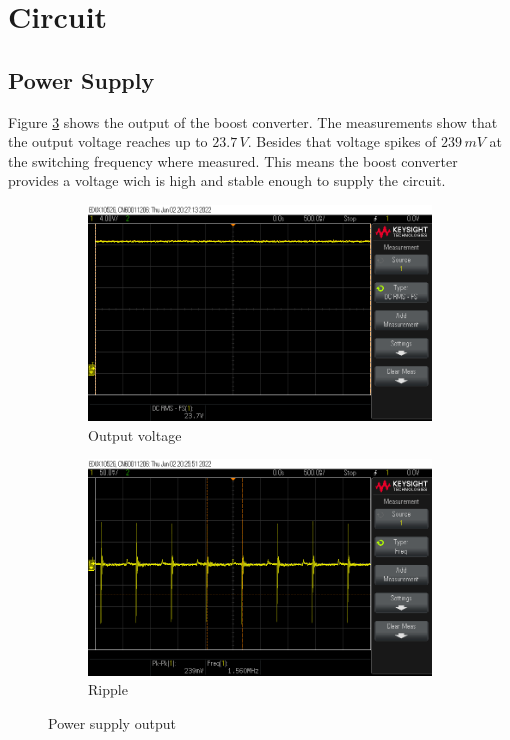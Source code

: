 \section{Circuit}

\subsection{Power Supply}

Figure \ref{fig:meas:circ:power} shows the output of the boost converter. The measurements show that the output voltage reaches up to $23.7\,V$. Besides that voltage spikes of $239\,mV$ at the switching frequency where measured. This means the boost converter provides a voltage wich is high and stable enough to supply the circuit.
%
\begin{figure}
  \centering
  \begin{subfigure}[b]{0.8\textwidth}
    \includegraphics[width=\textwidth]{src/assets/pictures/measurements/power_output_voltage.png}
    \caption{Output voltage}
    \label{fig:meas:circ:power_out}
  \end{subfigure}
  \hfill
  \begin{subfigure}[b]{0.8\textwidth}
    \includegraphics[width=\textwidth]{src/assets/pictures/measurements/power_ripple.png}
    \caption{Ripple}
    \label{fig:meas:circ:power_ripple}
  \end{subfigure}
  \caption{Power supply output}
  \label{fig:meas:circ:power}
\end{figure}

